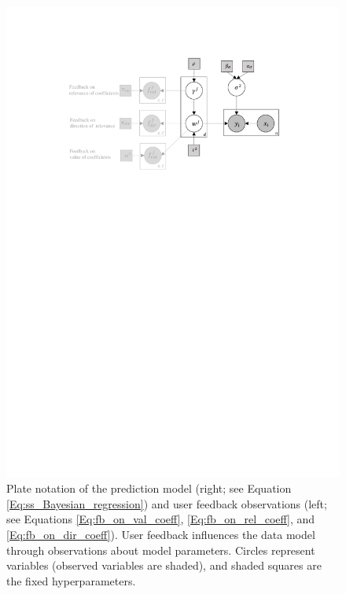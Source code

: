 \documentclass[dissertation,math,vertlayout,pdfa,colorlinks]{aaltoseries}
\begin{document}
\begin{figure}
	\includegraphics[width=\linewidth]{Figures/Plate_diagram_KE.pdf}
	\caption{Plate notation of the prediction model (right; see Equation \ref{Eq:ss_Bayesian_regression}) and user feedback observations (left; see Equations \ref{Eq:fb_on_val_coeff}, \ref{Eq:fb_on_rel_coeff}, and \ref{Eq:fb_on_dir_coeff}). User feedback influences the data model through observations about model parameters. Circles represent variables (observed variables are shaded), and shaded squares are the fixed hyperparameters.}
	\label{fig:Plate_KE}
\end{figure}
\end{document}
